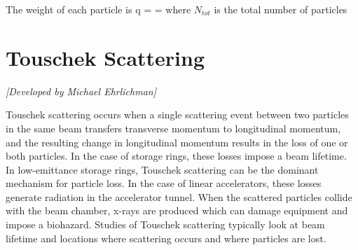 The weight of each particle is
\Begineq
  q =  = 
\Endeq
where $N_{tot}$ is the total number of particles

\section{Touschek Scattering}
\label{s:touschek}

\textit{[Developed by Michael Ehrlichman]}

Touschek scattering occurs when a single scattering event between two particles in the same beam
transfers transverse momentum to longitudinal momentum, and the resulting change in longitudinal
momentum results in the loss of one or both particles.  In the case of storage rings, these losses
impose a beam lifetime.  In low-emittance storage rings, Touschek scattering can be the dominant
mechanism for particle loss.  In the case of linear accelerators, these losses generate radiation in
the accelerator tunnel.  When the scattered particles collide with the beam chamber, x-rays are
produced which can damage equipment and impose a biohazard.  Studies of Touschek scattering
typically look at beam lifetime and locations where scattering occurs and where particles are lost.

